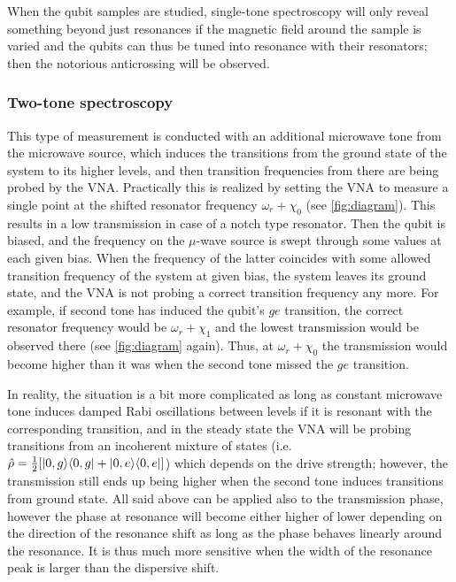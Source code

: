 When the qubit samples are studied, single-tone spectroscopy will only reveal something beyond just resonances if the magnetic field around the sample is varied and the qubits can thus be tuned into resonance with their resonators; then the notorious anticrossing will be observed.  

\subsubsection{Two-tone spectroscopy}
\label{sec:2tone}

This type of measurement is conducted with an additional microwave tone from the microwave source, which induces the transitions from the ground state of the system to its higher levels, and then transition frequencies from there are being probed by the VNA. Practically this is realized by setting the VNA to measure a single point at the shifted resonator  frequency $\omega_r + \chi_0$ (see \autoref{fig:diagram}). This results in a low transmission in case of a notch type resonator. Then the qubit is biased, and the frequency on the $\mu$-wave source is swept through some values at each given bias. When the frequency of the latter coincides with some allowed transition frequency of the system at given bias, the system leaves its ground state, and the VNA is not probing a correct transition frequency any more. For example, if second tone has induced the qubit's $ge$ transition, the correct resonator frequency would be $\omega_r + \chi_1$ and the lowest transmission would be observed there (see \autoref{fig:diagram} again). Thus, at $\omega_r + \chi_0$ the transmission would become higher than it was when the second tone missed the $ge$ transition. 

In reality, the situation is a bit more complicated as long as constant microwave tone induces damped Rabi oscillations between levels if it is resonant with the corresponding transition, and in the steady state the VNA will be probing transitions from an incoherent mixture of states (i.e. $\hat \rho = \frac{1}{2} [\lvert0, g\rangle\langle0,g\rvert + \lvert0, e\rangle\langle0,e\rvert]$) which depends on the drive strength; however, the transmission still ends up being higher when the second tone induces transitions from ground state. All said above can be applied also to the transmission phase, however the phase at resonance will become either higher of lower depending on the direction of the resonance shift as long as the phase behaves linearly around the resonance. It is thus much more sensitive when the width of the resonance peak is larger than the dispersive shift. 


